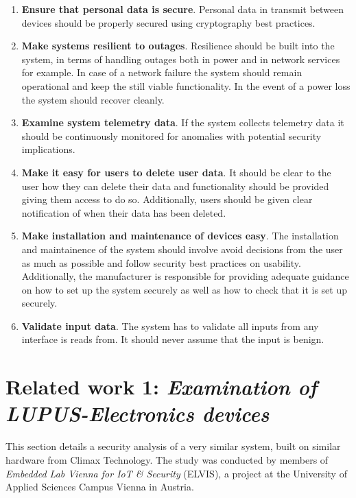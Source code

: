 \begin{enumerate}
    \item \textbf{Ensure that personal data is secure}. Personal data in transmit between devices should be properly secured using cryptography best practices.
    
    \item \textbf{Make systems resilient to outages}. Resilience should be built into the system, in terms of handling outages both in power and in network services for example. In case of a network failure the system should remain operational and keep the still viable functionality. In the event of a power loss the system should recover cleanly.
    
    \item \textbf{Examine system telemetry data}. If the system collects telemetry data it should be continuously monitored for anomalies with potential security implications.
    
    \item \textbf{Make it easy for users to delete user data}. It should be clear to the user how they can delete their data and functionality should be provided giving them access to do so. Additionally, users should be given clear notification of when their data has been deleted.
    
    \item \textbf{Make installation and maintenance of devices easy}. The installation and maintainence of the system should involve avoid decisions from the user as much as possible and follow security best practices on usability. Additionally, the manufacturer is responsible for providing adequate guidance on how to set up the system securely as well as how to check that it is set up securely.
    
    \item \textbf{Validate input data}. The system has to validate all inputs from any interface is reads from. It should never assume that the input is benign.
\end{enumerate}

\section{Related work 1: \textit{Examination of LUPUS-Electronics devices}} \label{ch:related-work:lupus}
This section details a security analysis of a very similar system, built on similar hardware from Climax Technology. The study was conducted by members of \textit{Embedded Lab Vienna for IoT \& Security} (ELVIS), a project at the University of Applied Sciences Campus Vienna in Austria.

